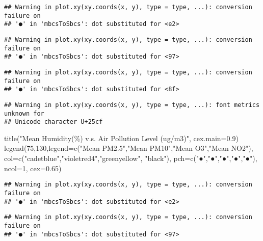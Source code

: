 \documentclass[
]{article}
\newenvironment{Shaded}{\begin{snugshade}}{\end{snugshade}}
\newcommand{\AttributeTok}[1]{\textcolor[rgb]{0.77,0.63,0.00}{#1}}
\newcommand{\DecValTok}[1]{\textcolor[rgb]{0.00,0.00,0.81}{#1}}
\newcommand{\FloatTok}[1]{\textcolor[rgb]{0.00,0.00,0.81}{#1}}
\newcommand{\FunctionTok}[1]{\textcolor[rgb]{0.00,0.00,0.00}{#1}}
\newcommand{\NormalTok}[1]{#1}
\newcommand{\StringTok}[1]{\textcolor[rgb]{0.31,0.60,0.02}{#1}}
\begin{document}
\begin{verbatim}
## Warning in plot.xy(xy.coords(x, y), type = type, ...): conversion failure on
## '●' in 'mbcsToSbcs': dot substituted for <e2>
\end{verbatim}

\begin{verbatim}
## Warning in plot.xy(xy.coords(x, y), type = type, ...): conversion failure on
## '●' in 'mbcsToSbcs': dot substituted for <97>
\end{verbatim}

\begin{verbatim}
## Warning in plot.xy(xy.coords(x, y), type = type, ...): conversion failure on
## '●' in 'mbcsToSbcs': dot substituted for <8f>
\end{verbatim}

\begin{verbatim}
## Warning in plot.xy(xy.coords(x, y), type = type, ...): font metrics unknown for
## Unicode character U+25cf
\end{verbatim}

\begin{Shaded}
\begin{Highlighting}[]
\FunctionTok{title}\NormalTok{(}\StringTok{"Mean Humidity(\%) v.s. Air Pollution Level (ug/m3)"}\NormalTok{, }\AttributeTok{cex.main=}\FloatTok{0.9}\NormalTok{)}
\FunctionTok{legend}\NormalTok{(}\DecValTok{75}\NormalTok{,}\DecValTok{130}\NormalTok{,}\AttributeTok{legend=}\FunctionTok{c}\NormalTok{(}\StringTok{"Mean PM2.5"}\NormalTok{,}\StringTok{"Mean PM10"}\NormalTok{,}\StringTok{"Mean O3"}\NormalTok{,}\StringTok{"Mean NO2"}\NormalTok{), }\AttributeTok{col=}\FunctionTok{c}\NormalTok{(}\StringTok{"cadetblue"}\NormalTok{,}\StringTok{"violetred4"}\NormalTok{,}\StringTok{"greenyellow"}\NormalTok{, }\StringTok{"black"}\NormalTok{), }\AttributeTok{pch=}\FunctionTok{c}\NormalTok{(}\StringTok{"●"}\NormalTok{,}\StringTok{"●"}\NormalTok{,}\StringTok{"●"}\NormalTok{,}\StringTok{"●"}\NormalTok{,}\StringTok{"●"}\NormalTok{), }\AttributeTok{ncol=}\DecValTok{1}\NormalTok{, }\AttributeTok{cex=}\FloatTok{0.65}\NormalTok{)}
\end{Highlighting}
\end{Shaded}

\begin{verbatim}
## Warning in plot.xy(xy.coords(x, y), type = type, ...): conversion failure on
## '●' in 'mbcsToSbcs': dot substituted for <e2>
\end{verbatim}

\begin{verbatim}
## Warning in plot.xy(xy.coords(x, y), type = type, ...): conversion failure on
## '●' in 'mbcsToSbcs': dot substituted for <97>
\end{verbatim}
\end{document}
